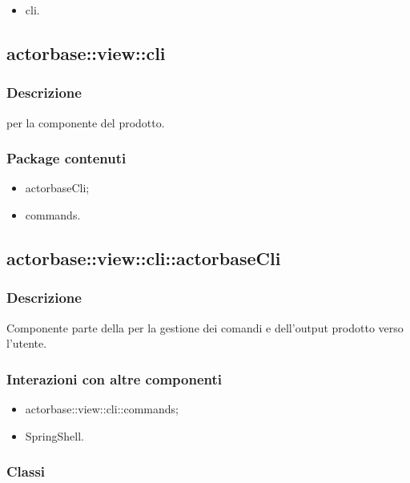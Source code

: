 \documentclass{scalatekids-article}
\begin{document}
\begin{itemize}
\item cli.
\end{itemize}

\subsection{actorbase::view::cli}

\subsubsection{Descrizione}

 per la componente  del prodotto.

\subsubsection{Package contenuti}

\begin{itemize}
\item actorbaseCli;
\item commands.
\end{itemize}

\subsection{actorbase::view::cli::actorbaseCli}

\subsubsection{Descrizione}

Componente parte della  per la gestione dei comandi e dell'output prodotto verso l'utente.

\subsubsection{Interazioni con altre componenti}

\begin{itemize}
\item actorbase::view::cli::commands;
\item SpringShell.
\end{itemize}

\subsubsection{Classi}
\end{document}
